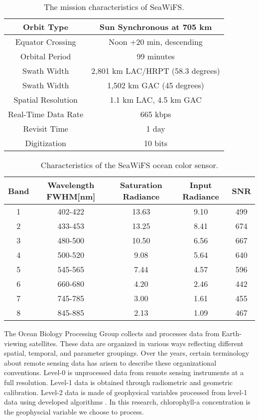  \begin{table}[h!]
 	\caption{The mission characteristics of SeaWiFS.}
 	\label{table01}
 	\centering
 	\begin{tabular}{c  c}
  	\toprule%
  	 	Orbit Type	& Sun Synchronous at 705 km \\ \hline
 	Equator Crossing &	Noon +20 min, descending \\ \hline
 	Orbital Period &	99 minutes  \\ \hline
 	Swath Width &	2,801 km LAC/HRPT (58.3 degrees)  \\ \hline
 	Swath Width &	1,502 km GAC (45 degrees)  \\ \hline
 	Spatial Resolution &	1.1 km LAC, 4.5 km GAC  \\ \hline
 	Real-Time Data Rate &	665 kbps  \\ \hline
 	Revisit Time &	1 day  \\ \hline
 	Digitization &	10 bits  \\ 
 	\bottomrule
 	\end{tabular}
 \end{table}

 \begin{table}[h!]%
	\caption{Characteristics of the SeaWiFS ocean color sensor.}
	\label{table02}
	\centering
	\begin{tabular}{c  c  c  c  c}
		\toprule
		Band	& Wavelength FWHM[nm] & Saturation Radiance & Input Radiance & SNR\\ %
		\midrule
		1 & 402-422 & 13.63 & 9.10 & 499 \\ %
		2 & 433-453 & 13.25 & 8.41 & 674  \\ %
		3 & 480-500 & 10.50 & 6.56 & 667 \\ %
		4 & 500-520 & 9.08 & 5.64 & 640  \\ %
		5 & 545-565 & 7.44 & 4.57 & 596 \\ %
		6 & 660-680 & 4.20 & 2.46 & 442  \\ %
		7 & 745-785 & 3.00 & 1.61 & 455 \\ %
		8 & 845-885 & 2.13 & 1.09 & 467  \\ %
		 	\bottomrule
	\end{tabular}
\end{table}
 
 

The Ocean Biology Processing Group collects and processes data from Earth-viewing satellites. These data are organized in various ways reflecting different spatial, temporal, and parameter groupings. Over the years, certain terminology about remote sensing data has arisen to describe these organizational conventions. Level-0 is unprocessed data from remote sensing instruments at a full resolution. Level-1 data is obtained through radiometric and geometric calibration. Level-2 data is made of geophysical variables processed from level-1 data using developed algorithms \cite{feldman2017ocean}. In this research, chlorophyll-a concentration is the geophyscial variable we choose to process.

